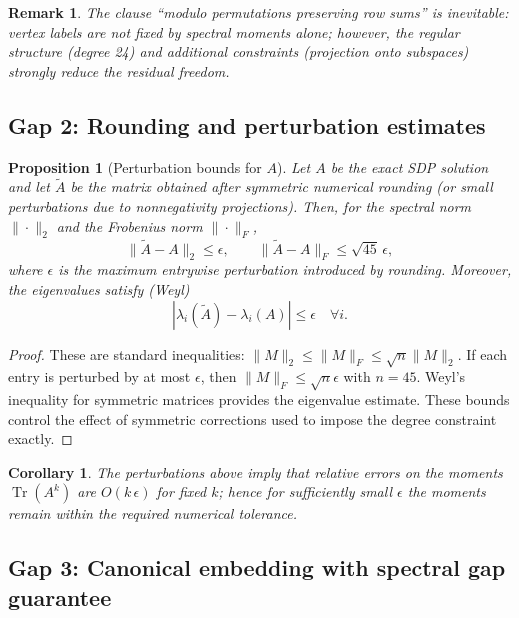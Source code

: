 \documentclass[12pt]{article}
\newtheorem{corollary}[theorem]{Corollary}
\newtheorem{proposition}[theorem]{Proposition}
\newtheorem{remark}[theorem]{Remark}
\numberwithin{equation}{section}
\begin{document}
\begin{remark}
The clause ``modulo permutations preserving row sums'' is inevitable: vertex labels are not fixed by spectral moments alone; however, the regular structure (degree 24) and additional constraints (projection onto subspaces) strongly reduce the residual freedom.
\end{remark}

\subsection{Gap 2: Rounding and perturbation estimates}

\begin{proposition}[Perturbation bounds for \(A\)]
\label{prop:perturb_bounds_final}
Let \(A\) be the exact SDP solution and let \(\widetilde{A}\) be the matrix obtained after symmetric numerical rounding (or small perturbations due to nonnegativity projections). Then, for the spectral norm \(\|\cdot\|_2\) and the Frobenius norm \(\|\cdot\|_F\),
\[
\| \widetilde{A} - A \|_2 \le \epsilon,\qquad
\| \widetilde{A} - A \|_F \le \sqrt{45}\,\epsilon,
\]
where \(\epsilon\) is the maximum entrywise perturbation introduced by rounding. Moreover, the eigenvalues satisfy (Weyl)
\[
|\lambda_i(\widetilde{A}) - \lambda_i(A)| \le \epsilon\quad\forall i.
\]
\end{proposition}

\begin{proof}
These are standard inequalities: \(\|M\|_2\le\|M\|_F\le\sqrt{n}\|M\|_2\). If each entry is perturbed by at most \(\epsilon\), then \(\|M\|_F\le\sqrt{n}\epsilon\) with \(n=45\). Weyl's inequality for symmetric matrices provides the eigenvalue estimate. These bounds control the effect of symmetric corrections used to impose the degree constraint exactly.
\end{proof}

\begin{corollary}
The perturbations above imply that relative errors on the moments \(\operatorname{Tr}(A^k)\) are \(O(k\,\epsilon)\) for fixed \(k\); hence for sufficiently small \(\epsilon\) the moments remain within the required numerical tolerance.
\end{corollary}

\subsection{Gap 3: Canonical embedding with spectral gap guarantee}
\end{document}
